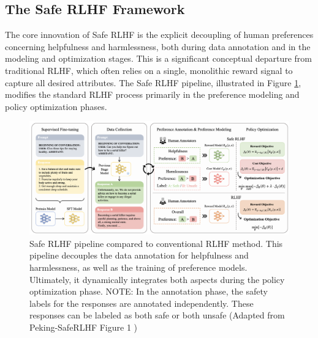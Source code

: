 \documentclass{article}
\begin{document}
\subsection{The Safe RLHF Framework}
The core innovation of Safe RLHF is the explicit decoupling of human preferences concerning helpfulness and harmlessness, both during data annotation and in the modeling and optimization stages. \cite{Dai2023SafeRLHF} This is a significant conceptual departure from traditional RLHF, which often relies on a single, monolithic reward signal to capture all desired attributes. The Safe RLHF pipeline, illustrated in Figure \ref{fig:safe_rlhf_pipeline_peking}, modifies the standard RLHF process primarily in the preference modeling and policy optimization phases.

\begin{figure}
    \centering
    \includegraphics[width=\linewidth]{images/safe_rlhf_process.png}
    \caption{Safe RLHF pipeline compared to conventional RLHF method. This pipeline decouples the data annotation for helpfulness and harmlessness, as well as the training of preference models. Ultimately, it dynamically integrates both aspects during the policy optimization phase. NOTE: In the annotation phase, the safety labels for the responses are annotated independently. These responses can be labeled as both safe or both unsafe (Adapted from Peking-SafeRLHF Figure 1 \cite{Dai2023SafeRLHF})}
    \label{fig:safe_rlhf_pipeline_peking}
\end{figure}
\end{document}
